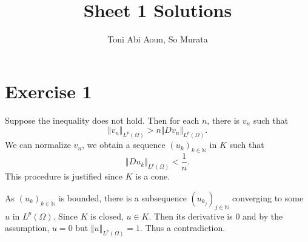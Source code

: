 \documentclass{article}
\title{Sheet 1 Solutions}
\author{Toni Abi Aoun, So Murata}
\date{}
\begin{document}
\maketitle

\section*{Exercise 1}

Suppose the inequality does not hold. Then for each $n$, there is $v_n$ such that
\begin{equation*}
\Vert v_n\Vert_{L^p(\Omega)} > n\Vert Dv_n\Vert_{L^p(\Omega)}.
\end{equation*}
We can normalize $v_n$, we obtain a sequence $(u_k)_{k\in\mathbb{N}}$ in $K$ such that
\begin{equation*}
\Vert Du_k\Vert_{L^p(\Omega)} < {\frac 1 n}.
\end{equation*}
This procedure is justified since $K$ is a cone.\\
\par As $(u_k)_{k\in\mathbb{N}}$ is bounded, there is a subsequence $(u_{k_j})_{j\in\mathbb{N}}$ converging to some $u$ in $L^p(\Omega)$. Since $K$ is closed, $u\in K$. Then its derivative is $0$ and by the assumption, $u=0$ but $\Vert u\Vert_{L^p(\Omega)}=1$. Thus a contradiction.
\end{document}
